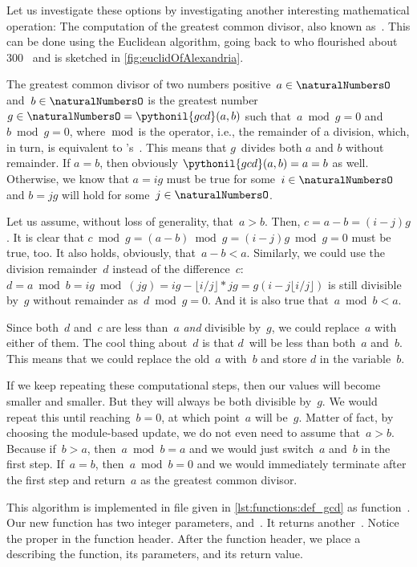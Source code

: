 Let us investigate these options by investigating another interesting mathematical operation:
The computation of the greatest common divisor, also known as~.
This can be done using the Euclidean algorithm, going back to \citeauthor{EHF2008EEOGTGOJLH11FEEEELIEILHIATBG11EAPWMETBFR:ENT} who flourished about 300~ and is sketched in \cref{fig:euclidOfAlexandria}.

The greatest common divisor of two numbers positive~$a\in\naturalNumbersO$ and~$b\in\naturalNumbersO$ is the greatest number~$g\in\naturalNumbersO=\pythonil{gcd}(a,b)$ such that~$a\bmod g=0$ and~$b \bmod g=0$, where~$\bmod$ is the  operator, i.e., the remainder of a division, which, in turn, is equivalent to \python's~\pythonilIdx{\%}.
This means that $g$~divides both $a$ and $b$ without remainder.
If $a=b$, then obviously $\pythonil{gcd}(a,b)=a=b$ as well.
Otherwise, we know that $a=ig$ must be true for some~$i\in\naturalNumbersO$ and $b=jg$ will hold for some~$j\in\naturalNumbersO$.

Let us assume, without loss of generality, that~$a>b$.
Then, $c=a-b=(i-j)g$.
It is clear that $c\bmod g=(a-b)\bmod g=(i-j)g\bmod g = 0$ must be true, too.
It also holds, obviously, that~$a-b < a$.
Similarly, we could use the division remainder~$d$ instead of the difference~$c$:
$d=a\bmod b=ig\bmod (jg)=ig-\lfloor i/j\rfloor*jg=g(i-j\lfloor i/j\rfloor)$ is still divisible by~$g$ without remainder as~$d\bmod g=0$.
And it is also true that~$a\bmod b < a$.

Since both~$d$ and~$c$ are less than~$a$ \emph{and} divisible by~$g$, we could replace~$a$ with either of them.
The cool thing about~$d$ is that $d$~will be less than both~$a$ and~$b$.
This means that we could replace the old~$a$ with~$b$ and store $d$ in the variable~$b$.

If we keep repeating these computational steps, then our values will become smaller and smaller.
But they will always be both divisible by~$g$.
We would repeat this until reaching~$b=0$, at which point~$a$ will be~$g$.
Matter of fact, by choosing the module-based update, we do not even need to assume that~$a>b$.
Because if~$b>a$, then~$a \bmod b=a$ and we would just switch~$a$ and~$b$ in the first step.
If~$a=b$, then~$a \bmod b=0$ and we would immediately terminate after the first step and return~$a$ as the greatest common divisor.

This algorithm is implemented in file  given in \cref{lst:functions:def_gcd} as function~.
Our new function  has two integer parameters,  and~.
It returns another~.
Notice the proper  in the function header.
After the function header, we place a  describing the function, its parameters, and its return value.

